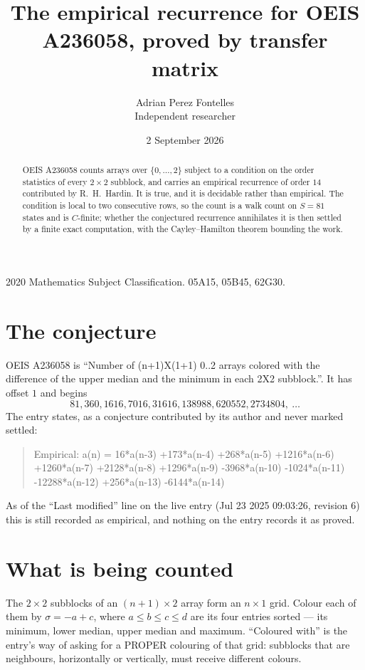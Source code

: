 \documentclass[11pt,a4paper]{article}
\title{The empirical recurrence for OEIS A236058, proved by transfer matrix}
\author{Adrian Perez Fontelles\\ \small Independent researcher}
\date{2 September 2026}
\theoremstyle{plain}
\theoremstyle{definition}
\begin{document}
\maketitle

\begin{abstract}
OEIS A236058 counts arrays over $\{0,\dots,2\}$ subject to a condition on the order
statistics of every $2\times2$ subblock, and carries an empirical recurrence of order
$14$ contributed by R.~H.~Hardin. It is true, and it is decidable rather than empirical.
The condition is local to two consecutive rows, so the count is a walk count on $S=81$
states and is $C$-finite; whether the conjectured recurrence annihilates it is then settled by
a finite exact computation, with the Cayley--Hamilton theorem bounding the work.
\end{abstract}

\noindent\small 2020 Mathematics Subject Classification. 05A15, 05B45, 62G30.\normalsize

\section{The conjecture}

OEIS A236058 is ``Number of (n+1)X(1+1) 0..2 arrays colored with the difference of the upper median and the minimum in each 2X2 subblock.''. It has offset $1$ and begins
\[
81, 360, 1616, 7016, 31616, 138988, 620552, 2734804,\ \dots
\]
The entry states, as a conjecture contributed by its author and never marked settled:
\begin{quote}
Empirical: a(n) = 16*a(n-3) +173*a(n-4) +268*a(n-5) +1216*a(n-6) +1260*a(n-7) +2128*a(n-8) +1296*a(n-9) -3968*a(n-10) -1024*a(n-11) -12288*a(n-12) +256*a(n-13) -6144*a(n-14)
\end{quote}
As of the ``Last modified'' line on the live entry (Jul 23 2025 09:03:26, revision 6) this is still
recorded as empirical, and nothing on the entry records it as proved.

\section{What is being counted}

The $2\times2$ subblocks of an $(n+1)\times2$ array form an
$n\times1$ grid. Colour each of them by $\sigma=-a+c$, where $a\le b\le c\le d$ are its four entries sorted --- its minimum, lower median, upper median and maximum. ``Coloured with'' is the entry's way of
asking for a PROPER colouring of that grid: subblocks that are neighbours, horizontally or
vertically, must receive different colours.
\end{document}
